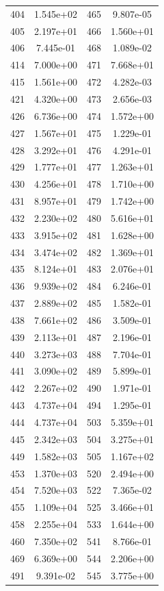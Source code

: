 \documentclass[12pt]{article}
\begin{document}
\begin{longtable}{@{}cccc@{}}
404 & 1.545e+02 & 465 & 9.807e-05 \\
405 & 2.197e+01 & 466 & 1.560e+01 \\
406 & 7.445e-01 & 468 & 1.089e-02 \\
414 & 7.000e+00 & 471 & 7.668e+01 \\
415 & 1.561e+00 & 472 & 4.282e-03 \\
421 & 4.320e+00 & 473 & 2.656e-03 \\
426 & 6.736e+00 & 474 & 1.572e+00 \\
427 & 1.567e+01 & 475 & 1.229e-01 \\
428 & 3.292e+01 & 476 & 4.291e-01 \\
429 & 1.777e+01 & 477 & 1.263e+01 \\
430 & 4.256e+01 & 478 & 1.710e+00 \\
431 & 8.957e+01 & 479 & 1.742e+00 \\
432 & 2.230e+02 & 480 & 5.616e+01 \\
433 & 3.915e+02 & 481 & 1.628e+00 \\
434 & 3.474e+02 & 482 & 1.369e+01 \\
435 & 8.124e+01 & 483 & 2.076e+01 \\
436 & 9.939e+02 & 484 & 6.246e-01 \\
437 & 2.889e+02 & 485 & 1.582e-01 \\
438 & 7.661e+02 & 486 & 3.509e-01 \\
439 & 2.113e+01 & 487 & 2.196e-01 \\
440 & 3.273e+03 & 488 & 7.704e-01 \\
441 & 3.090e+02 & 489 & 5.899e-01 \\
442 & 2.267e+02 & 490 & 1.971e-01 \\
443 & 4.737e+04 & 494 & 1.295e-01 \\
444 & 4.737e+04 & 503 & 5.359e+01 \\
445 & 2.342e+03 & 504 & 3.275e+01 \\
449 & 1.582e+03 & 505 & 1.167e+02 \\
453 & 1.370e+03 & 520 & 2.494e+00 \\
454 & 7.520e+03 & 522 & 7.365e-02 \\
455 & 1.109e+04 & 525 & 3.466e+01 \\
458 & 2.255e+04 & 533 & 1.644e+00 \\
460 & 7.350e+02 & 541 & 8.766e-01 \\
469 & 6.369e+00 & 544 & 2.206e+00 \\
491 & 9.391e-02 & 545 & 3.775e+00 \\

\end{longtable}
\end{document}
